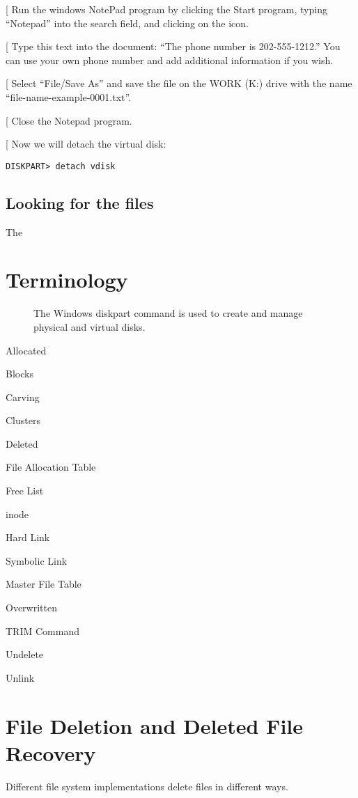 \documentclass[11pt,letter]{book}
\makeatletter
\def\step{%
   \@ifnextchar[ \@step{\@noitemargtrue\@step[\@itemlabel]}}
\def\@step[#1]{\item[#1]\mbox{}\hspace*{\dimexpr-\labelwidth-\labelsep}}
\newcommand{\sgraphic}[3][width=\linewidth]{
  \begin{figure}
  \begin{center}
  \fbox{\texttt{[image: \#2]}}
  \end{center}
  \caption{#3\label{#2}}
  \end{figure}
}
\makeatother
\begin{document}
\begin{steps}
\step Run the windows NotePad program by clicking the Start program,
typing ``Notepad'' into the search field, and clicking on the icon.

\step Type this text into the document:  ``The phone number is
202-555-1212.'' You can use your own phone number and add additional
information if you wish.

\step Select ``File/Save As'' and save the file on the WORK (K:) drive
with the name ``file-name-example-0001.txt''. 

\step Close the Notepad program.

\step Now we will detach the virtual disk:

\begin{Verbatim}
DISKPART> detach vdisk
\end{Verbatim}
\end{steps}

\subsection{Looking for the files}
The 

\section{Terminology}
\sgraphic{art/diskpart-1}{The Windows diskpart command is used to create and
  manage physical and virtual disks.}


Allocated

Blocks

Carving

Clusters

Deleted

File Allocation Table

Free List

inode

Hard Link

Symbolic Link

Master File Table

Overwritten

TRIM Command

Undelete

Unlink



\section{File Deletion and Deleted File Recovery}\label{deleted_file_recovery}
Different file system implementations delete files in different ways.
\end{document}

